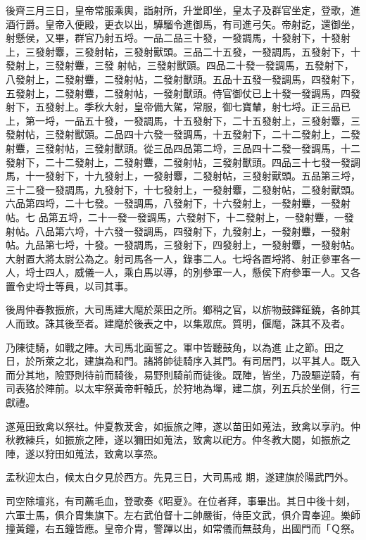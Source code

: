 \begin{pinyinscope}
 後齊三月三日，皇帝常服乘輿，詣射所，升堂即坐，皇太子及群官坐定，登歌，進酒行爵。皇帝入便殿，更衣以出，驊騮令進御馬，有司進弓矢。帝射訖，還御坐，射懸侯，又畢，群官乃射五埒。一品二品三十發，一發調馬，十發射下，十發射上，三發射麞，三發射帖，三發射獸頭。三品二十五發，一發調馬，五發射下，十發射上，三發射麞，三發
 射帖，三發射獸頭。四品二十發一發調馬，五發射下，八發射上，二發射麞，二發射帖，二發射獸頭。五品十五發一發調馬，四發射下，五發射上，二發射麞，二發射帖，一發射獸頭。侍官御仗已上十發一發調馬，四發射下，五發射上。季秋大射，皇帝備大駕，常服，御七寶輦，射七埒。正三品已上，第一埒，一品五十發，一發調馬，十五發射下，二十五發射上，三發射麞，三發射帖，三發射獸頭。二品四十六發一發調馬，十五發射下，二十二發射上，二發射麞，三發射帖，三發射獸頭。從三品四品第二埒，三品四十二發一發調馬，十二發射下，二十二發射上，二發射麞，二發射帖，三發射獸頭。四品三十七發一發調馬，十一發射下，十九發射上，一發射麞，二發射帖，三發射獸頭。五品第三埒，三十二發一發調馬，九發射下，十七發射上，一發射麞，二發射帖，二發射獸頭。六品第四埒，二十七發。一發調馬，八發射下，十六發射上，一發射麞，一發射帖。七
 品第五埒，二十一發一發調馬，六發射下，十二發射上，一發射麞，一發射帖。八品第六埒，十六發一發調馬，四發射下，九發射上，一發射麞，一發射帖。九品第七埒，十發。一發調馬，三發射下，四發射上，一發射麞，一發射帖。大射置大將太尉公為之。射司馬各一人，錄事二人。七埒各置埒將、射正參軍各一人，埒士四人，威儀一人，乘白馬以導，的別參軍一人，懸侯下府參軍一人。又各置令史埒士等員，以司其事。



 後周仲春教振旅，大司馬建大麾於萊田之所。鄉稍之官，以旂物鼓鐸鉦鐃，各帥其人而致。誅其後至者。建麾於後表之中，以集眾庶。質明，偃麾，誅其不及者。



 乃陳徒騎，如戰之陣。大司馬北面誓之。軍中皆聽鼓角，以為進
 止之節。田之日，於所萊之北，建旗為和門。諸將帥徒騎序入其門。有司居門，以平其人。既入而分其地，險野則待前而騎後，易野則騎前而徒後。既陣，皆坐，乃設驅逆騎，有司表狢於陣前。以太牢祭黃帝軒轅氏，於狩地為墠，建二旗，列五兵於坐側，行三獻禮。



 遂蒐田致禽以祭社。仲夏教茇舍，如振旅之陣，遂以苗田如蒐法，致禽以享礿。仲秋教練兵，如振旅之陣，遂以獮田如蒐法，致禽以祀方。仲冬教大閱，如振旅之陣，遂以狩田如蒐法，致禽以享烝。



 孟秋迎太白，候太白夕見於西方。先見三日，大司馬戒
 期，遂建旗於陽武門外。



 司空除壇兆，有司薦毛血，登歌奏《昭夏》。在位者拜，事畢出。其日中後十刻，六軍士馬，俱介胄集旗下。左右武伯督十二帥嚴街，侍臣文武，俱介胄奉迎。樂師撞黃鐘，右五鐘皆應。皇帝介胄，警蹕以出，如常儀而無鼓角，出國門而「Ｑ祭。




\end{pinyinscope}
